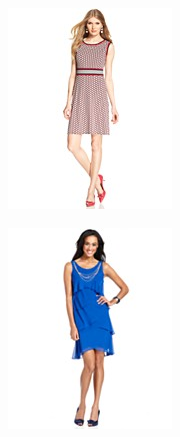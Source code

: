 \documentclass[11pt]{article}
\begin{document}
\begin{figure}
\begin{subfigure}{.18\textwidth}
\includegraphics[width=\linewidth]{concepts/concept1_pos2.jpg}
\label{fig:sub2}
\end{subfigure}
\begin{subfigure}{.18\textwidth}
\centering
\includegraphics[width=\linewidth]{concepts/concept1_pos3.jpg}

\end{subfigure}
\end{figure}
\end{document}
